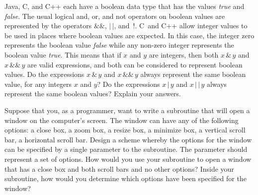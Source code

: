 \begin{exercises}
\problem Java, C, and C++ each have a boolean data type that has the values
\textit{true} and \textit{false}.  The usual logical and, or, and not operators
on boolean values are represented by the operators $\&\&$, $|\,|$, and~!.
C~and C++ allow integer values to be used in places where boolean values
are expected.  In this case, the integer zero represents the boolean
value \textit{false} while any non-zero integer represents the boolean
value \textit{true}.  This means that if $x$ and $y$ are integers,
then both $x\,\&\,y$ and $x\,\&\&\,y$ are valid expressions, and both can
be considered to represent boolean values.  Do the expressions
$x\,\&\,y$ and $x\,\&\&\,y$ always represent the same boolean value,
for any integers $x$ and $y$?  Do the expressions $x\,|\,y$ and $x\,|\,|\,y$
always represent the same boolean values?  Explain your answers.

\problem Suppose that you, as a programmer, want to write a subroutine
that will open a window on the computer's screen.  The window can have
any of the following options:  a close box, a zoom box, a resize box, 
a minimize box, a vertical scroll bar, a horizontal scroll bar.
Design a scheme whereby the options for the window can be specified
by a single parameter to the subroutine.  The parameter should represent
a set of options.  How would you use your subroutine to open
a window that has a close box and both scroll bars and no other options?
Inside your subroutine, how would you determine which options have been
specified for the window?


\end{exercises}




